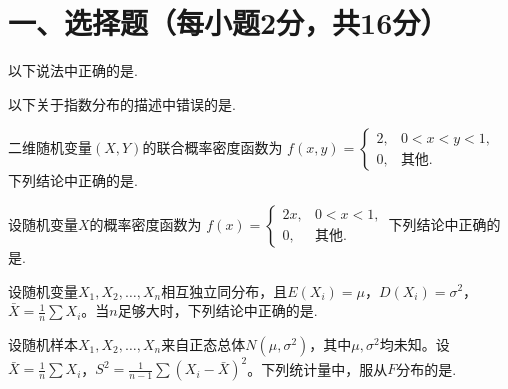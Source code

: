 \documentclass[answerspace=14]{shnu-exam}
\begin{document}
\maketitle

\section{一、选择题（每小题2分，共16分）}

\question 以下说法中正确的是.

\question 以下关于指数分布的描述中错误的是.

\question 二维随机变量$(X,Y)$的联合概率密度函数为
$f(x,y)=\begin{cases}2,&0<x<y<1\text{,}\\0,&\text{其他.}\end{cases}$
下列结论中正确的是.

\question 设随机变量$X$的概率密度函数为
$f(x)=\begin{cases}2x,&0<x<1\text{,}\\0,&\text{其他.}\end{cases}$
下列结论中正确的是.

\question 设随机变量$X_1,X_2,\dots,X_n$相互独立同分布，且$E(X_i)=\mu$，$D(X_i)=\sigma^2$，$\bar{X}=\frac1n\sum X_i$。当$n$足够大时，下列结论中正确的是.

\question 设随机样本$X_1,X_2,\dots,X_n$来自正态总体$N(\mu,\sigma^2)$，其中$\mu,\sigma^2$均未知。设$\bar{X}=\frac1n\sum X_i$，$S^2=\frac1{n-1}\sum(X_i-\bar{X})^2$。下列统计量中，服从$F$分布的是.
\end{document}
